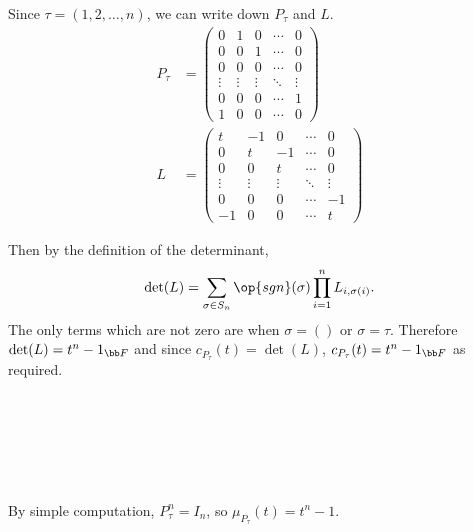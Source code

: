 \documentclass[a4paper]{article}
\begin{document}
Since $\tau = (1, 2, \dotsc, n)$, we can write down $P_\tau$ and $L$.
\begin{align*}
P_\tau &= \begin{pmatrix}
0 & 1 & 0 & \cdots & 0 \\
0 & 0 & 1 & \cdots & 0 \\
0 & 0 & 0 & \cdots & 0 \\
\vdots & \vdots & \vdots & \ddots & \vdots \\
0 & 0 & 0 & \cdots & 1 \\
1 & 0 & 0 & \cdots & 0
\end{pmatrix} \\[1ex]
L &= \begin{pmatrix}
t & -1 & 0 & \cdots & 0 \\
0 & t & -1 & \cdots & 0 \\
0 & 0 & t & \cdots & 0 \\
\vdots & \vdots & \vdots & \ddots & \vdots \\
0 & 0 & 0 & \cdots & -1 \\
-1 & 0 & 0 & \cdots & t
\end{pmatrix}
\end{align*}

Then by the definition of the determinant, \[
\det(L) = \sum_{\sigma \in S_n} \op{sgn}(\sigma) \prod_{i=1}^n L_{i, \sigma(i)}.
\] The only terms which are not zero are when $\sigma = ()$ or $\sigma = \tau$. Therefore $\det(L) = t^n - 1_{\bb F}$ and since $c_{P_\tau}(t) = \det(L)$, $c_{P_\tau}(t) = t^n - 1_{\bb F}$ as required.

\subsection{~} %


\setcounter{subsubsection}{1}

\subsubsection{~} %

By simple computation, $P_\tau^n = I_n$, so $\mu_{P_\tau}(t) = t^n - 1$.


\end{document}
